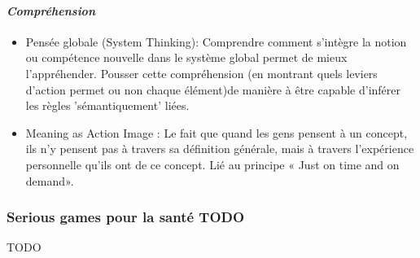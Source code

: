 			\paragraph{\emph{Compréhension}}
		\begin{itemize}
				\item {Pensée globale (System Thinking)}: Comprendre comment s'intègre la notion ou compétence nouvelle dans le système global permet de mieux l'appréhender. Pousser cette compréhension (en montrant quels leviers d'action permet ou non chaque élément)de manière à être capable d'inférer les règles 'sémantiquement' liées.
				\item {Meaning as Action Image} : Le fait que quand les gens pensent à un concept, ils n'y
pensent pas à travers sa définition générale, mais à travers l'expérience personnelle qu'ils ont de ce concept. Lié au principe « Just on time and on demand».
		\end{itemize}	

	\subsubsection{Serious games pour la santé TODO}
TODO 
